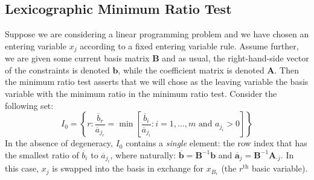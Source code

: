 \subsection{Lexicographic Minimum Ratio Test}
Suppose we are considering a linear programming problem and we have chosen an entering variable $x_j$ according to a fixed entering variable rule. Assume further, we are given some current basis matrix $\mathbf{B}$ and as usual, the right-hand-side vector of the constraints is denoted $\mathbf{b}$, while the coefficient matrix is denoted $\mathbf{A}$. Then the minimum ratio test asserts that we will chose as the leaving variable the basis variable with the minimum ratio in the minimum ratio test. Consider the following set:
\begin{equation}
I_0 = \left\{r : \frac{\overline{b}_r}{{\overline{a}_{j_r}}} = \min\left[ \frac{\overline{b}_i}{\overline{a}_{j_i}} : i=1,\dots,m \text{ and } a_{j_i} > 0 \right]\right\}
\end{equation}
In the absence of degeneracy, $I_0$ contains a \textit{single} element: the row index that has the smallest ratio of $\overline{b}_i$ to $\overline{a}_{j_i}$, where naturally: $\overline{\mathbf{b}} = \mathbf{B}^{-1}\mathbf{b}$ and $\overline{\mathbf{a}}_j = \mathbf{B}^{-1}\mathbf{A}_{\cdot j}$. In this case, $x_j$ is swapped into the basis in exchange for $x_{B_r}$ (the $r^\text{th}$ basic variable).

